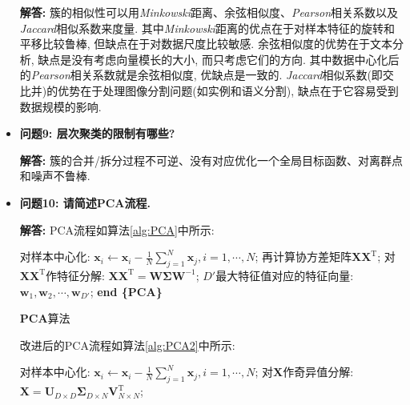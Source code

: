 \documentclass{article}
\begin{document}
\begin{homeworkProblem}
\begin{itemize}
		\textbf{解答:} 簇的相似性可以用\textit{Minkowski}距离、余弦相似度、\textit{Pearson}相关系数以及\textit{Jaccard}相似系数来度量. 其中\textit{Minkowski}距离的优点在于对样本特征的旋转和平移比较鲁棒, 但缺点在于对数据尺度比较敏感. 余弦相似度的优势在于文本分析, 缺点是没有考虑向量模长的大小, 而只考虑它们的方向. 其中数据中心化后的\textit{Pearson}相关系数就是余弦相似度, 优缺点是一致的. \textit{Jaccard}相似系数(即交比并)的优势在于处理图像分割问题(如实例和语义分割), 缺点在于它容易受到数据规模的影响.
		\item \textbf{问题9: 层次聚类的限制有哪些?}
		
		\textbf{解答:} 簇的合并/拆分过程不可逆、没有对应优化一个全局目标函数、对离群点和噪声不鲁棒.
		\item \textbf{问题10: 请简述PCA流程.}
		
		\textbf{解答:} PCA流程如算法\ref{alg:PCA}中所示:
		\begin{algorithm}[H]
			\begin{algorithmic}[1]
			\State 对样本中心化: $\displaystyle \boldsymbol{x}_i\gets \boldsymbol{x}_i-\frac{1}{N}\sum_{j=1}^N{\boldsymbol{x}_j},i=1,\cdots,N$;
			\State 再计算协方差矩阵$\boldsymbol{X}\boldsymbol{X}^{\text{T}}$;
			\State 对$\boldsymbol{X}\boldsymbol{X}^{\text{T}}$作特征分解: $\boldsymbol{XX}^{\text{T}}=\boldsymbol{W}\boldsymbol{\Sigma }\boldsymbol{W}^{-1}$;
			\State $D'$最大特征值对应的特征向量: $\boldsymbol{w}_1,\boldsymbol{w}_2,\cdots ,\boldsymbol{w}_{D'}$;
			\State \textbf{end \{PCA\}}
			\end{algorithmic}
			\caption{\textbf{PCA}算法}
			\label{alg:PCA}
		\end{algorithm}
		改进后的PCA流程如算法\ref{alg:PCA2}中所示:
		\begin{algorithm}[H]
			\begin{algorithmic}[1]
			\State 对样本中心化: $\displaystyle \boldsymbol{x}_i\gets \boldsymbol{x}_i-\frac{1}{N}\sum_{j=1}^N{\boldsymbol{x}_j},i=1,\cdots,N$;
			\State 对$\boldsymbol{X}$作奇异值分解: $\boldsymbol{X}=\boldsymbol{U}_{D\times D}\boldsymbol{\Sigma} _{D\times N}\boldsymbol{V}_{N\times N}^{\text{T}}$;

\end{algorithmic}
\end{algorithm}
\end{itemize}
\end{homeworkProblem}
\end{document}
